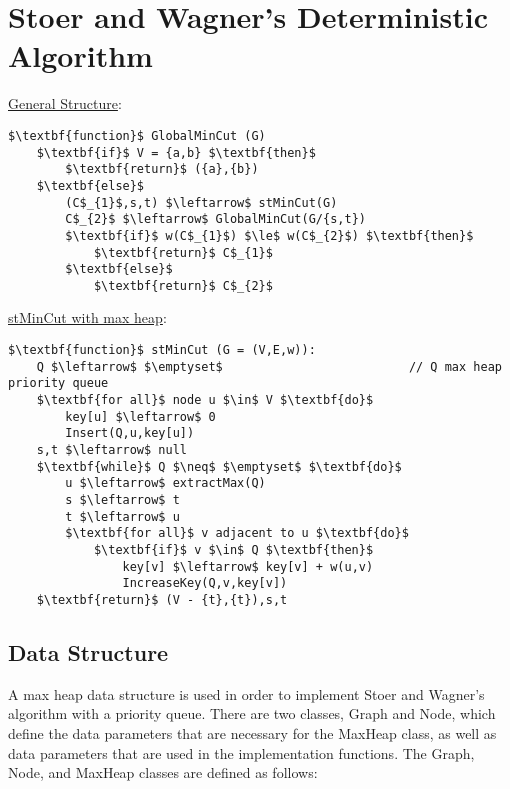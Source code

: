 \section{Stoer and Wagner's Deterministic Algorithm}\label{stoer}


\underline{General Structure}:
\begin{lstlisting}[mathescape=true]
$\textbf{function}$ GlobalMinCut (G)
    $\textbf{if}$ V = {a,b} $\textbf{then}$
        $\textbf{return}$ ({a},{b})
    $\textbf{else}$
        (C$_{1}$,s,t) $\leftarrow$ stMinCut(G)
        C$_{2}$ $\leftarrow$ GlobalMinCut(G/{s,t})
        $\textbf{if}$ w(C$_{1}$) $\le$ w(C$_{2}$) $\textbf{then}$
            $\textbf{return}$ C$_{1}$
        $\textbf{else}$
            $\textbf{return}$ C$_{2}$
\end{lstlisting}	
\underline{stMinCut with max heap}:
\begin{lstlisting}[mathescape=true]
$\textbf{function}$ stMinCut (G = (V,E,w)):
    Q $\leftarrow$ $\emptyset$                          // Q max heap priority queue
    $\textbf{for all}$ node u $\in$ V $\textbf{do}$
        key[u] $\leftarrow$ 0
        Insert(Q,u,key[u])
    s,t $\leftarrow$ null
    $\textbf{while}$ Q $\neq$ $\emptyset$ $\textbf{do}$
        u $\leftarrow$ extractMax(Q)
        s $\leftarrow$ t
        t $\leftarrow$ u
        $\textbf{for all}$ v adjacent to u $\textbf{do}$
            $\textbf{if}$ v $\in$ Q $\textbf{then}$
                key[v] $\leftarrow$ key[v] + w(u,v)
                IncreaseKey(Q,v,key[v])
    $\textbf{return}$ (V - {t},{t}),s,t

\end{lstlisting}

\subsection{Data Structure}
A max heap data structure is used in order to implement Stoer and Wagner's algorithm with a priority queue. There are two classes, Graph and Node, which define the data parameters that are necessary for the MaxHeap class, as well as data parameters that are used in the implementation functions. The Graph, Node, and MaxHeap classes are defined as follows:

